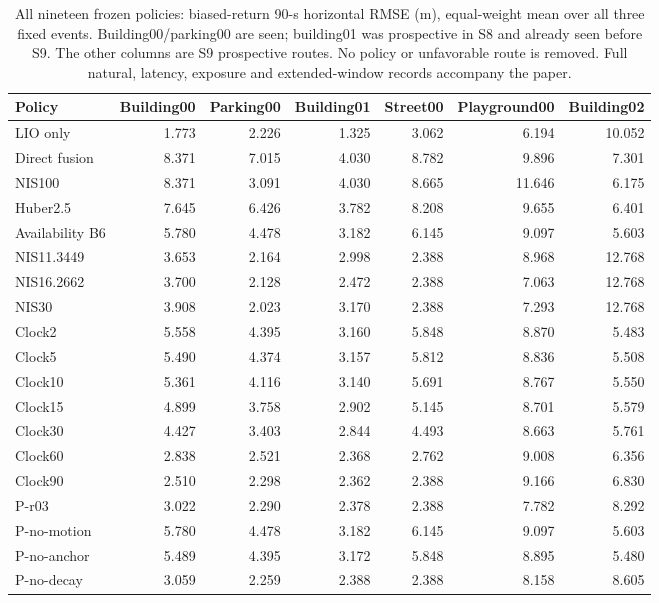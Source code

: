 \begin{table}[t]\centering\small
\caption{All nineteen frozen policies: biased-return 90-s horizontal RMSE (m), equal-weight mean over all three fixed events. Building00/parking00 are seen; building01 was prospective in S8 and already seen before S9. The other columns are S9 prospective routes. No policy or unfavorable route is removed. Full natural, latency, exposure and extended-window records accompany the paper.}\label{tab:allroutes}
\begin{tabular}{lrrrrrr}\toprule
Policy & Building00 & Parking00 & Building01 & Street00 & Playground00 & Building02 \\\midrule
LIO only & 1.773 & 2.226 & 1.325 & 3.062 & 6.194 & 10.052 \\
Direct fusion & 8.371 & 7.015 & 4.030 & 8.782 & 9.896 & 7.301 \\
NIS100 & 8.371 & 3.091 & 4.030 & 8.665 & 11.646 & 6.175 \\
Huber2.5 & 7.645 & 6.426 & 3.782 & 8.208 & 9.655 & 6.401 \\
Availability B6 & 5.780 & 4.478 & 3.182 & 6.145 & 9.097 & 5.603 \\
NIS11.3449 & 3.653 & 2.164 & 2.998 & 2.388 & 8.968 & 12.768 \\
NIS16.2662 & 3.700 & 2.128 & 2.472 & 2.388 & 7.063 & 12.768 \\
NIS30 & 3.908 & 2.023 & 3.170 & 2.388 & 7.293 & 12.768 \\
Clock2 & 5.558 & 4.395 & 3.160 & 5.848 & 8.870 & 5.483 \\
Clock5 & 5.490 & 4.374 & 3.157 & 5.812 & 8.836 & 5.508 \\
Clock10 & 5.361 & 4.116 & 3.140 & 5.691 & 8.767 & 5.550 \\
Clock15 & 4.899 & 3.758 & 2.902 & 5.145 & 8.701 & 5.579 \\
Clock30 & 4.427 & 3.403 & 2.844 & 4.493 & 8.663 & 5.761 \\
Clock60 & 2.838 & 2.521 & 2.368 & 2.762 & 9.008 & 6.356 \\
Clock90 & 2.510 & 2.298 & 2.362 & 2.388 & 9.166 & 6.830 \\
P-r03 & 3.022 & 2.290 & 2.378 & 2.388 & 7.782 & 8.292 \\
P-no-motion & 5.780 & 4.478 & 3.182 & 6.145 & 9.097 & 5.603 \\
P-no-anchor & 5.489 & 4.395 & 3.172 & 5.848 & 8.895 & 5.480 \\
P-no-decay & 3.059 & 2.259 & 2.388 & 2.388 & 8.158 & 8.605 \\
\bottomrule\end{tabular}\end{table}
